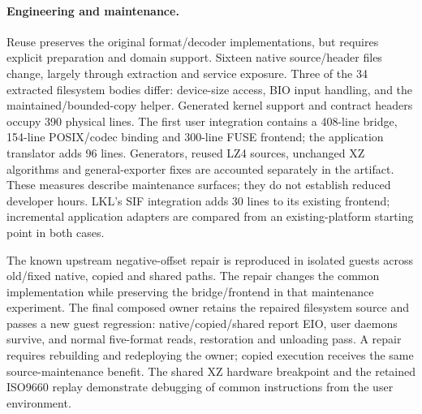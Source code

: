 \paragraph{Engineering and maintenance.}
Reuse preserves the original format/decoder implementations, but requires
explicit preparation and domain support. Sixteen native source/header files
change, largely through extraction and service exposure. Three of the
34 extracted filesystem bodies differ: device-size access, BIO input
handling, and the maintained/bounded-copy helper. Generated kernel support
and contract headers occupy 390 physical lines. The first user integration
contains a 408-line bridge, 154-line POSIX/codec binding and 300-line FUSE
frontend; the application translator adds 96 lines. Generators, reused LZ4
sources, unchanged XZ algorithms and general-exporter fixes are accounted
separately in the artifact. These measures describe maintenance surfaces;
they do not establish reduced developer hours. LKL's SIF integration adds
30 lines to its existing frontend; incremental application adapters are
compared from an existing-platform starting point in both cases.

The known upstream negative-offset repair is reproduced in isolated guests
across old/fixed native, copied and shared paths. The repair changes the
common implementation while preserving the bridge/frontend in that
maintenance experiment. The final composed owner retains the repaired
filesystem source and passes a new guest regression: native/copied/shared
report EIO, user daemons survive, and normal five-format reads, restoration
and unloading pass. A repair requires rebuilding and redeploying the owner;
copied execution receives the same source-maintenance benefit. The shared
XZ hardware breakpoint and the retained ISO9660 replay demonstrate debugging
of common instructions from the user environment.

